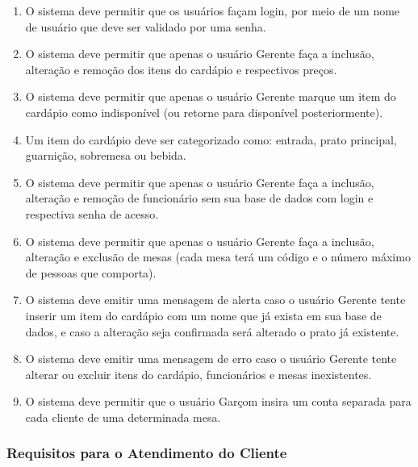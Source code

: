 \documentclass[11pt,a4paper]{article}
\begin{document}
\begin{enumerate}
    \item O sistema deve permitir que os usuários façam login, por meio de um nome de usuário que deve ser validado por uma senha.
    \item O sistema deve permitir que apenas o usuário Gerente faça a inclusão, alteração e remoção dos itens do cardápio e respectivos preços.
    \item O sistema deve permitir que apenas o usuário Gerente marque um item do cardápio como indisponível (ou retorne para disponível posteriormente).
    \item Um item do cardápio deve ser categorizado como: entrada, prato principal, guarnição, sobremesa ou bebida.
    \item O sistema deve permitir que apenas o usuário Gerente faça a inclusão, alteração e remoção de funcionário sem sua base de dados com login e respectiva senha de acesso.
    \item O sistema deve permitir que apenas o usuário Gerente faça a inclusão, alteração e exclusão de mesas (cada mesa terá um código e o número máximo de pessoas que comporta).
    \item O sistema deve emitir uma mensagem de alerta caso o usuário Gerente tente inserir um item do cardápio com um nome que já exista em sua base de dados, e caso a alteração seja confirmada será alterado o prato já existente.
    \item O sistema deve emitir uma mensagem de erro caso o usuário Gerente tente alterar ou excluir itens do cardápio, funcionários e mesas inexistentes.
    \item O sistema deve permitir que o usuário Garçom insira um conta separada para cada cliente de uma determinada mesa.
\end{enumerate}

\subsubsection{Requisitos para o Atendimento do Cliente}
\end{document}
